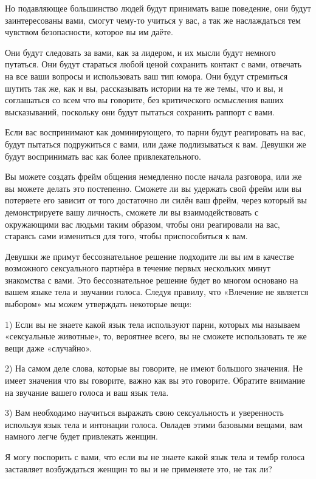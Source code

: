 Но подавляющее большинство людей будут принимать ваше поведение, они будут заинтересованы вами, смогут чему-то учиться у вас, а так же наслаждаться тем чувством безопасности, которое вы им даёте.

Они будут следовать за вами, как за лидером, и их мысли будут немного путаться. Они будут стараться любой ценой сохранить контакт с вами, отвечать на все ваши вопросы и использовать ваш тип юмора. Они будут стремиться шутить так же, как и вы, рассказывать истории на те же темы, что и вы, и соглашаться со всем что вы говорите, без критического осмысления ваших высказываний, поскольку они будут пытаться сохранить раппорт с вами.

Если вас воспринимают как доминирующего, то парни будут реагировать на вас, будут пытаться подружиться с вами, или даже подлизываться к вам. Девушки же будут воспринимать вас как более привлекательного.

Вы можете создать фрейм общения немедленно после начала разговора, или же вы можете делать это постепенно. Сможете ли вы удержать свой фрейм или вы потеряете его зависит от того достаточно ли силён ваш фрейм, через который вы демонстрируете вашу личность, сможете ли вы взаимодействовать с окружающими вас людьми таким образом, чтобы они реагировали на вас, стараясь сами измениться для того, чтобы приспособиться к вам.

Девушки же примут бессознательное решение подходите ли вы им в качестве возможного сексуального партнёра в течение первых нескольких минут знакомства с вами. Это бессознательное решение будет во многом основано на вашем языке тела и звучании голоса. Следуя правилу, что «Влечение не является выбором» мы можем утверждать некоторые вещи:

1) Если вы не знаете какой язык тела используют парни, которых мы называем «сексуальные животные», то, вероятнее всего, вы не сможете использовать те же вещи даже «случайно».

2) На самом деле слова, которые вы говорите, не имеют большого значения. Не имеет значения что вы говорите, важно как вы это говорите. Обратите внимание на звучание вашего голоса и ваш язык тела.

3) Вам необходимо научиться выражать свою сексуальность и уверенность используя язык тела и интонации голоса. Овладев этими базовыми вещами, вам намного легче будет привлекать женщин.

Я могу поспорить с вами, что если вы не знаете какой язык тела и тембр голоса заставляет возбуждаться женщин то вы и не применяете это, не так ли?

